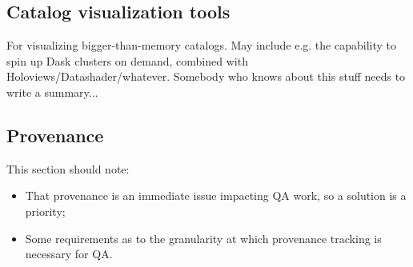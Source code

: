 \documentclass[DM,authoryear,toc,lsstdraft]{lsstdoc}
\begin{document}
\subsection{Catalog visualization tools}


For visualizing bigger-than-memory catalogs. May include e.g. the capability
to spin up Dask clusters on demand, combined with
Holoviews/Datashader/whatever. Somebody who knows about this stuff needs to
write a summary...

\subsection{Provenance}


This section should note:

\begin{itemize}

  \item{That provenance is an immediate issue impacting QA work, so a solution
  is a priority;}

  \item{Some requirements as to the granularity at which provenance tracking
  is necessary for QA.}

\end{itemize}

\appendix
\glsaddall
\printglossary[style=index]


\end{document}
